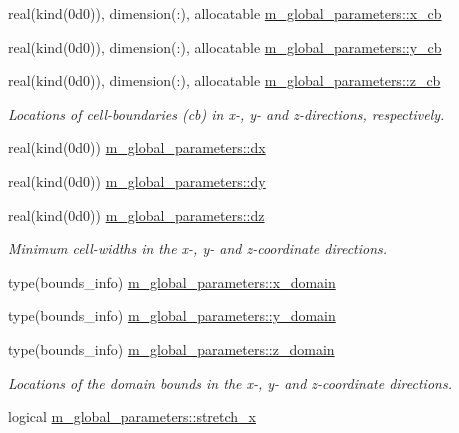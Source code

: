 \begin{DoxyCompactItemize}
real(kind(0d0)), dimension(\+:), allocatable \hyperlink{namespacem__global__parameters_abd9ada93ee5222de406111ee9c91ddf0}{m\+\_\+global\+\_\+parameters\+::x\+\_\+cb}
\item 
real(kind(0d0)), dimension(\+:), allocatable \hyperlink{namespacem__global__parameters_aa436c56a050419e85c8c08611a688e63}{m\+\_\+global\+\_\+parameters\+::y\+\_\+cb}
\item 
real(kind(0d0)), dimension(\+:), allocatable \hyperlink{namespacem__global__parameters_a1f932e794cad6291b2e6c62b93dcf533}{m\+\_\+global\+\_\+parameters\+::z\+\_\+cb}
\begin{DoxyCompactList}\small\item\em Locations of cell-\/boundaries (cb) in x-\/, y-\/ and z-\/directions, respectively. \end{DoxyCompactList}\item 
real(kind(0d0)) \hyperlink{namespacem__global__parameters_aaa9a08d5b90f48e0f6bb64c209fd89e4}{m\+\_\+global\+\_\+parameters\+::dx}
\item 
real(kind(0d0)) \hyperlink{namespacem__global__parameters_a5ff5660b10330ad917331259642e8dc4}{m\+\_\+global\+\_\+parameters\+::dy}
\item 
real(kind(0d0)) \hyperlink{namespacem__global__parameters_ab930758827576d5cf2518679bf670351}{m\+\_\+global\+\_\+parameters\+::dz}
\begin{DoxyCompactList}\small\item\em Minimum cell-\/widths in the x-\/, y-\/ and z-\/coordinate directions. \end{DoxyCompactList}\item 
type(bounds\+\_\+info) \hyperlink{namespacem__global__parameters_a58e390acc41a75facd63f1d89a8e60bc}{m\+\_\+global\+\_\+parameters\+::x\+\_\+domain}
\item 
type(bounds\+\_\+info) \hyperlink{namespacem__global__parameters_a94bfe5cc861c66dadab450d25a6b5817}{m\+\_\+global\+\_\+parameters\+::y\+\_\+domain}
\item 
type(bounds\+\_\+info) \hyperlink{namespacem__global__parameters_a4b6341f4ce0cc9c395b4791549357efc}{m\+\_\+global\+\_\+parameters\+::z\+\_\+domain}
\begin{DoxyCompactList}\small\item\em Locations of the domain bounds in the x-\/, y-\/ and z-\/coordinate directions. \end{DoxyCompactList}\item 
logical \hyperlink{namespacem__global__parameters_a95a3647227ae84b17613caee22408853}{m\+\_\+global\+\_\+parameters\+::stretch\+\_\+x}

\end{DoxyCompactItemize}
